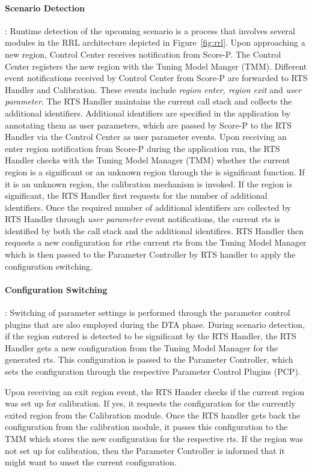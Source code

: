 \paragraph{Scenario Detection}: Runtime detection of the upcoming scenario is a process that involves several modules in
the RRL architecture depicted in Figure~\ref{fig:rrl}. Upon approaching a new region, Control Center receives notification from Score-P. The Control Center registers the new region with the Tuning Model Manger (TMM). Different event notifications received by Control Center from Score-P are forwarded to RTS Handler and Calibration. These events include \textit{region enter, region exit} and \textit{user parameter}. The RTS Handler maintains the current call stack and collects the additional identifiers. Additional identifiers are specified in the application by annotating them as user parameters, which are passed by Score-P to the RTS Handler via the Control Center as user parameter events. Upon receiving an enter region notification from Score-P during the application run,
the RTS Handler checks with the Tuning Model Manager (TMM) whether the current region is a significant or an unknown region through the is significant function. If it is an unknown region, the calibration mechanism is invoked.
If the region is significant, the RTS Handler first requests for the number of additional identifiers. Once the required number of additional identifiers are collected by RTS Handler through \textit{user parameter} event notifications, the current rts is identified by both the call stack and the additional identifires. RTS Handler then requests a new configuration for rthe current rts from the Tuning Model Manager which is
then passed to the Parameter Controller by RTS handler to apply the configuration switching. 
\paragraph{Configuration Switching}: Switching of parameter settings is performed through the parameter control plugins that are also employed during the DTA phase.
During scenario detection, if the region entered is detected to be significant by the RTS Handler, the RTS Handler gets a new configuration from the Tuning Model Manager for
the generated rts. This configuration is passed to the Parameter
Controller, which sets the configuration through the respective Parameter Control Plugins (PCP).

Upon receiving an exit region event, the RTS Hander checks if the current region was set up for calibration. If yes, it requests the configuration for the currently exited region from the
Calibration module. Once the RTS handler gets back the configuration from the calibration module, it passes this configuration to the TMM which stores the new configuration for the respective rts. If the region was not set up for calibration, then the Parameter Controller is informed that it might want to unset the current configuration. 

